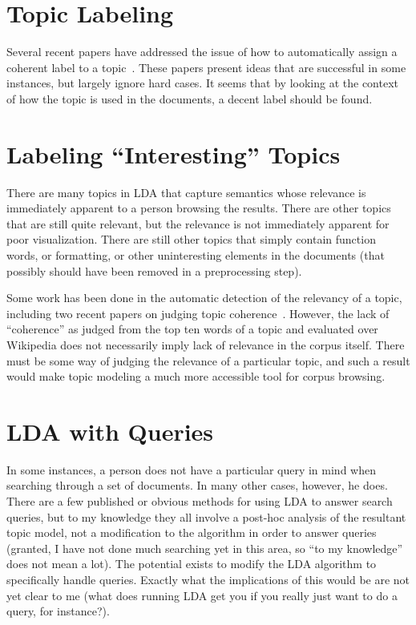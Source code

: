 \documentclass[onecolumn, 12pt]{article}
\begin{document}
\section{Topic Labeling}

Several recent papers have addressed the issue of how to automatically assign a
coherent label to a topic~\cite{mei-2007-automatic-labeling-of-topic-models,
lau-2010-best-topic-word-selection}.  These papers present ideas that are
successful in some instances, but largely ignore hard cases.  It seems that by
looking at the context of how the topic is used in the documents, a decent
label should be found.

\section{Labeling ``Interesting'' Topics}

There are many topics in LDA that capture semantics whose relevance is
immediately apparent to a person browsing the results.  There are other topics
that are still quite relevant, but the relevance is not immediately apparent
for poor visualization.  There are still other topics that simply contain
function words, or formatting, or other uninteresting elements in the documents
(that possibly should have been removed in a preprocessing step).

Some work has been done in the automatic detection of the relevancy of a topic,
including two recent papers on judging topic
coherence~\cite{chang-2009-reading-tea-leaves,
newman-2010-automatic-evaluation-of-topic-coherence}.  However, the lack of
``coherence'' as judged from the top ten words of a topic and evaluated over
Wikipedia does not necessarily imply lack of relevance in the corpus itself.
There must be some way of judging the relevance of a particular topic, and such
a result would make topic modeling a much more accessible tool for corpus
browsing.

\section{LDA with Queries}

In some instances, a person does not have a particular query in mind when
searching through a set of documents.  In many other cases, however, he does.
There are a few published or obvious methods for using LDA to answer search
queries, but to my knowledge they all involve a post-hoc analysis of the
resultant topic model, not a modification to the algorithm in order to answer
queries (granted, I have not done much searching yet in this area, so ``to my
knowledge'' does not mean a lot).  The potential exists to modify the LDA
algorithm to specifically handle queries.  Exactly what the implications of
this would be are not yet clear to me (what does running LDA get you if you
really just want to do a query, for instance?).



\end{document}
